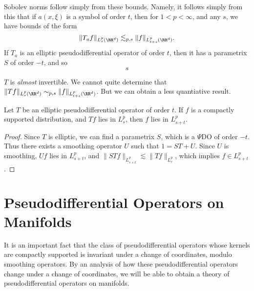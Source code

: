 Sobolev norms follow simply from these bounds. Namely, it follows simply from this that if $a(x,\xi)$ is a symbol of order $t$, then for $1 < p < \infty$, and any $s$, we have bounds of the form
%
\[ \| T_a f \|_{L^p_s(\RR^d)} \lesssim_{p,s} \| f \|_{L^p_{t + s}(\RR^d)}. \]
%
If $T_a$ is an elliptic pseudodifferential operator of order $t$, then it has a parametrix $S$ of order $-t$, and so
%
\[ s \]

$T$ is \emph{almost} invertible. We cannot quite determine that $\| T f \|_{L^p_s(\RR^d)} \sim_{p,s} \| f \|_{L^p_{t + s}(\RR^d)}$. But we can obtain a less quantiative result.

\begin{theorem}
    Let $T$ be an elliptic pseudodifferential operator of order $t$. If $f$ is a compactly supported distribution, and $Tf$ lies in $L^p_s$, then $f$ lies in $L^p_{s + t}$.
\end{theorem}
\begin{proof}
    Since $T$ is elliptic, we can find a parametrix $S$, which is a $\Psi$DO of order $-t$. Thus there exists a smoothing operator $U$ such that $1 = ST + U$. Since $U$ is smoothing, $Uf$ lies in $L^p_{s + t}$, and $\| STf \|_{L^p_{s + t}} \lesssim \| Tf \|_{L^p_s}$, which implies $f \in L^p_{s + t}$.
\end{proof}















\section{Pseudodifferential Operators on Manifolds}

It is an important fact that the class of pseudodifferential operators whose kernels are compactly supported is invariant under a change of coordinates, modulo smoothing operators. By an analysis of how these pseudodifferential operators change under a change of coordinates, we will be able to obtain a theory of pseudodifferential operators on manifolds.

